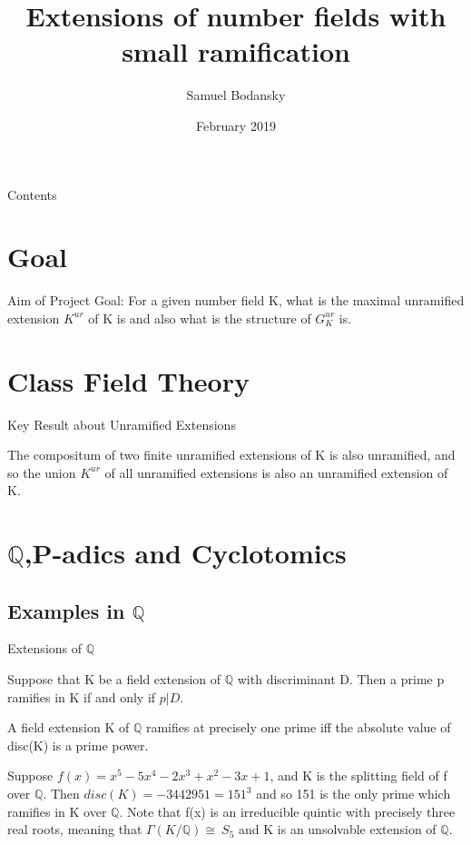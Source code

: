 \documentclass[10pt]{beamer}
\title[Part C Dissertation] %
{Extensions of number fields with small ramification}
\subtitle
{}
\author %
{Samuel Bodansky}
\institute %
{
  University of Oxford
  }
\date %
{February 2019}
\begin{document}
\begin{frame}
  \titlepage
\end{frame}
\begin{frame}{Contents}
\tableofcontents
\end{frame}

\section{Goal}
\begin{frame}{Aim of Project}
Goal: For a given number field K, what is the maximal unramified extension $K^{ur}$ of K is and also what is the structure of $G_K^{ur}$ is.

\end{frame}

\section{Class Field Theory}

\begin{frame}{Key Result about Unramified Extensions}
    \begin{theorem}
The compositum of two finite unramified extensions of K is also unramified, and so the union $K^{ur}$ of all unramified extensions is also an unramified extension of K.
\end{theorem}

\end{frame}

\section{$\mathbb{Q}$,P-adics and Cyclotomics}
\subsection{Examples in $\mathbb{Q}$}
\begin{frame}{Extensions of $\mathbb{Q}$}
    \begin{theorem}
     Suppose that K be a field extension of $\mathbb{Q}$ with discriminant D. Then a prime p
ramifies in K if and only if $p|D$.   
    \end{theorem}
    \begin{corollary}
A field extension K of $\mathbb{Q}$ ramifies at precisely one prime iff the absolute value of disc(K) is a prime power.
\end{corollary}
\begin{example}
    Suppose $f(x)=x^5-5x^4-2x^3+x^2-3x+1$, and K is the splitting field of f over $\mathbb{Q}$. Then $disc(K)=-3442951=151^3$ and so 151 is the only prime which ramifies in K over $\mathbb{Q}$. Note that f(x) is an irreducible quintic with precisely three real roots, meaning that $\Gamma(K/\mathbb{Q})\cong\ S_5$ and K is an unsolvable extension of $\mathbb{Q}$.
\end{example}
\end{frame}
\end{document}
